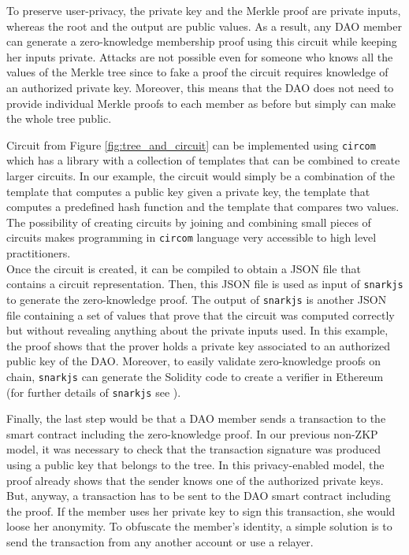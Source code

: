 \documentclass{IEEEcsmag}
\begin{document}
To preserve user-privacy, the private key and the Merkle proof are 
private inputs, whereas the root and the output are public values. 
As a result, any DAO member can generate a zero-knowledge membership 
proof using this circuit while keeping her inputs private. 
Attacks are not possible even for someone who knows all the values of 
the Merkle tree
since to fake a proof the circuit requires knowledge of an authorized private key. 
Moreover, this means that the DAO does not need to provide individual Merkle proofs to 
each member as before but simply can make the whole tree public. 

Circuit from Figure \ref{fig:tree_and_circuit} 
can be implemented using \texttt{circom} which 
has a library with a collection of templates that can be combined to 
create larger circuits. 
In our example, the circuit would simply be a combination of
the template that computes a public key given a private key, the template 
that computes a predefined hash function and the template that compares two values. 
The possibility of creating circuits by joining and combining small pieces of circuits 
makes programming in \texttt{circom} language very accessible to high level
practitioners. \\

Once the circuit is created, it can be compiled to obtain a JSON file that
contains a circuit representation.
Then, this JSON file is used as input of \texttt{snarkjs}
to generate the zero-knowledge proof.
The output of \texttt{snarkjs} is another JSON file containing 
a set of values that prove that the circuit was computed correctly 
but without revealing anything about the private inputs used. 
In this example, the proof shows that the prover holds a private key associated to 
an authorized public key of the DAO. 
Moreover, to easily validate zero-knowledge proofs on chain,
\texttt{snarkjs}
can generate the Solidity code to create a verifier in Ethereum
(for further details of \texttt{snarkjs} see \cite{snarkjs}).

Finally, the last step would be that a DAO member sends a transaction 
to the smart contract including the zero-knowledge proof. 
In our previous non-ZKP model, it was necessary to check 
that the transaction signature was produced using a public 
key that belongs to the tree.
In this privacy-enabled model, the proof already shows that the sender knows one of the authorized private keys.
But, anyway, a transaction has to be sent to the DAO smart contract 
including the proof.
If the member uses her private key to sign this transaction, 
she would loose her anonymity.
To obfuscate the member's identity, a simple solution is to 
send the transaction from any another account or use a relayer.
\end{document}
